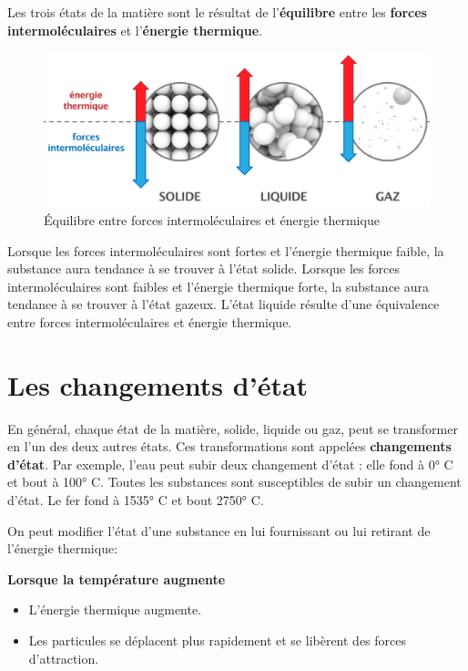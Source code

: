\documentclass[
  11pt,
  french,
  a4paper,
  openany]{book}
\providecommand{\tightlist}{%
  \setlength{\itemsep}{0pt}\setlength{\parskip}{0pt}}
\begin{document}
Les trois états de la matière sont le résultat de l'\textbf{équilibre} entre les \textbf{forces intermoléculaires} et l'\textbf{énergie thermique}.

\begin{figure}

{\centering \includegraphics[width=0.67\linewidth]{images/mvt-thermique} 

}

\caption{Équilibre entre forces intermoléculaires et énergie thermique}\label{fig:mvt-thermique}
\end{figure}

Lorsque les forces intermoléculaires sont fortes et l'énergie thermique faible, la substance aura tendance à se trouver à l'état solide. Lorsque les forces intermoléculaires sont faibles et l'énergie thermique forte, la substance aura tendance à se trouver à l'état gazeux. L'état liquide résulte d'une équivalence entre forces intermoléculaires et énergie thermique.

\hypertarget{les-changements-duxe9tat}{%
\section{Les changements d'état}\label{les-changements-duxe9tat}}

En général, chaque état de la matière, solide, liquide ou gaz, peut se transformer en l'un des deux autres états. Ces transformations sont appelées \textbf{changements d'état}. Par exemple, l'eau peut subir deux changement d'état : elle fond à 0° C et bout à 100° C. Toutes les substances sont susceptibles de subir un changement d'état. Le fer fond à 1535° C et bout 2750° C.

On peut modifier l'état d'une substance en lui fournissant ou lui retirant de l'énergie thermique:

\textbf{Lorsque la température augmente}

\begin{itemize}
\tightlist
\item
  L'énergie thermique augmente.
\item
  Les particules se déplacent plus rapidement et se libèrent des forces d'attraction.
\end{itemize}
\end{document}
